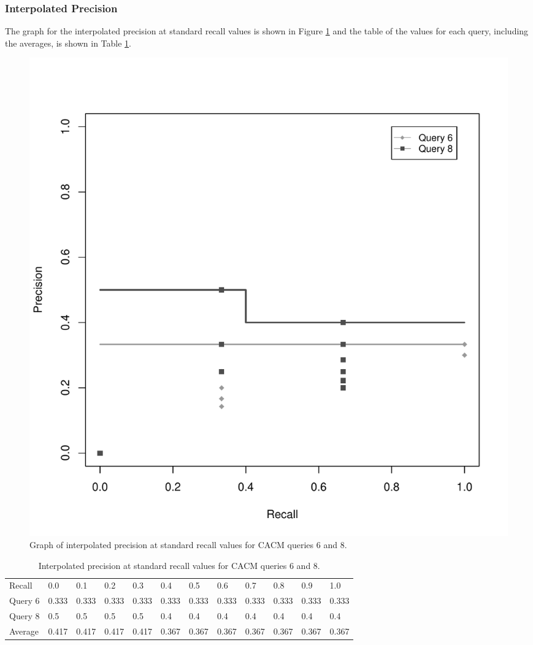 \subsubsection{Interpolated Precision}
The graph for the interpolated precision at standard recall values is shown in Figure \ref{fig:iprgraph68} and the table of the values for each query, including the averages, is shown in Table \ref{tab:ipr68}.

\begin{figure}[H]
\centering
\label{fig:iprgraph68}
\includegraphics[scale=.7]{code/getrel/ipr68.pdf}
\caption{Graph of interpolated precision at standard recall values for CACM queries 6 and 8.}
\end{figure}

\begin{table}[H]
\centering
\begin{tabular}{ l l l l l l l l l l l l }
Recall & 0.0 & 0.1 & 0.2 & 0.3 & 0.4 & 0.5 & 0.6 & 0.7 & 0.8 & 0.9 & 1.0 \\
\cline{2-12}
Query 6 & 0.333 & 0.333 & 0.333 & 0.333 & 0.333 & 0.333 & 0.333 & 0.333 & 0.333 & 0.333 & 0.333 \\
\cline{2-12}
Query 8 & 0.5 & 0.5 & 0.5 & 0.5 & 0.4 & 0.4 & 0.4 & 0.4 & 0.4 & 0.4 & 0.4 \\
\cline{2-12}
Average & 0.417 & 0.417 & 0.417 & 0.417 & 0.367 & 0.367 & 0.367 & 0.367 & 0.367 & 0.367 & 0.367 \\
\cline{2-12}
\end{tabular}
\caption{Interpolated precision at standard recall values for CACM queries 6 and 8.}
\label{tab:ipr68}
\end{table}

